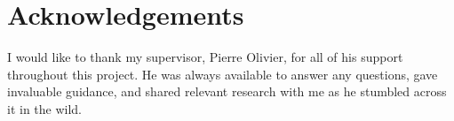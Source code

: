 \clearpage

\section*{Acknowledgements}

I would like to thank my supervisor, Pierre Olivier, for all of his support
throughout this project. He was always available to answer any questions, gave
invaluable guidance, and shared relevant research with me as he stumbled across
it in the wild. 

\clearpage

\tableofcontents

\clearpage

\printacronyms[name=Acronyms and Abbreviations]

\clearpage

\listoffigures

\clearpage

\listoftables

\clearpage

\listoflistings
